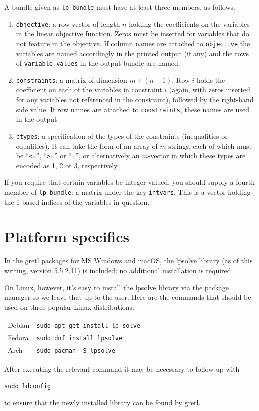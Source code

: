\documentclass{article}
\begin{document}
A bundle given as \texttt{lp\_bundle} must have at least three
members, as follows.
\begin{enumerate}
\item \texttt{objective}: a row vector of length $n$ holding the
  coefficients on the variables in the linear objective
  function. Zeros must be inserted for variables that do not feature
  in the objective. If column names are attached to
  \texttt{objective} the variables are named accordingly in the
  printed output (if any) and the rows of \texttt{variable\_values}
  in the output bundle are named.
\item \texttt{constraints}: a matrix of dimension $m \times
  (n+1)$. Row $i$ holds the coefficient on each of the variables in
  constraint $i$ (again, with zeros inserted for any variables not
  referenced in the constraint), followed by the right-hand side
  value. If row names are attached to \texttt{constraints}, these
  names are used in the output.
\item \texttt{ctypes}: a specification of the types of the constraints
  (inequalities or equalities). It can take the form of an array of
  $m$ strings, each of which must be ``\texttt{<=}'', ``\texttt{>=}''
  or ``\texttt{=}'', or alternatively an $m$-vector in which these
  types are encoded as 1, 2 or 3, respectively.
\end{enumerate}

If you require that certain variables be integer-valued, you should
supply a fourth member of \texttt{lp\_bundle}: a matrix under the key
\texttt{intvars}. This is a vector holding the 1-based indices of the
variables in question.

\section{Platform specifics}
\label{sec:platforms}

In the gretl packages for MS Windows and macOS, the \textsf{lpsolve}
library (as of this writing, version 5.5.2.11) is included; no
additional installation is required.

On Linux, however, it's easy to install the \textsf{lpsolve} library
via the package manager so we leave that up to the user. Here are the
commands that should be used on three popular Linux distributions:
\begin{center}
  \begin{tabular}{ll}
  Debian & \texttt{sudo apt-get install lp-solve} \\
  Fedora & \texttt{sudo dnf install lpsolve} \\
  Arch & \texttt{sudo pacman -S lpsolve}
\end{tabular}
\end{center}
After executing the relevant command it may be necessary to follow up
with
\begin{verbatim}
sudo ldconfig
\end{verbatim}
to ensure that the newly installed library can be found by gretl.
\end{document}

